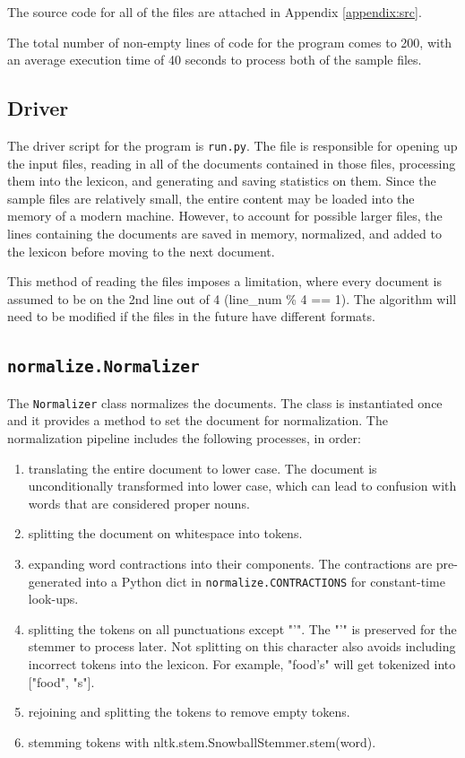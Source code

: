 \documentclass[11pt]{article}
\begin{document}
The source code for all of the files are attached in Appendix \ref{appendix:src}.

The total number of non-empty lines of code for the program comes to 200, with an average execution time of 40 seconds to process both of the sample files.

\subsection{Driver} \label{sec:driver}
The driver script for the program is \texttt{run.py}. The file is responsible for opening up the input files, reading in all of the documents contained in those files, processing them into the lexicon, and generating and saving statistics on them. Since the sample files are relatively small, the entire content may be loaded into the memory of a modern machine. However, to account for possible larger files, the lines containing the documents are saved in memory, normalized, and added to the lexicon before moving to the next document.

This method of reading the files imposes a limitation, where every document is assumed to be on the 2nd line out of 4 (line\_num \% 4 == 1). The algorithm will need to be modified if the files in the future have different formats.

\subsection{\texttt{normalize.Normalizer}}
The \texttt{Normalizer} class normalizes the documents. The class is instantiated once and it provides a method to set the document for normalization. The normalization pipeline includes the following processes, in order:

\begin{enumerate}
    \item translating the entire document to lower case. The document is unconditionally transformed into lower case, which can lead to confusion with words that are considered proper nouns.

    \item splitting the document on whitespace into tokens.

    \item expanding word contractions into their components. The contractions are pre-generated into a Python dict in \texttt{normalize.CONTRACTIONS} for constant-time look-ups.

    \item splitting the tokens on all punctuations except "'". The "'" is preserved for the stemmer to process later. Not splitting on this character also avoids including incorrect tokens into the lexicon. For example, "food's" will get tokenized into ["food", "s"].

    \item rejoining and splitting the tokens to remove empty tokens.

    \item stemming tokens with nltk.stem.SnowballStemmer.stem(word).
\end{enumerate}
\end{document}
